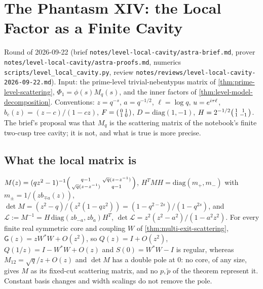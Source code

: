 \section{The Phantasm XIV: the Local Factor as a Finite Cavity}
\label{sec:level-local-cavity}

Round of 2026-09-22 (brief \texttt{notes/level-local-cavity/astra-brief.md}, prover \texttt{notes/level-local-cavity/astra-proofs.md},
numerics \texttt{scripts/level\_local\_cavity.py}, review \texttt{notes/reviews/level-local-cavity-2026-09-22.md}). Input:
the prime-level trivial-nebentypus matrix of \cref{thm:prime-level-scattering}, $\Phi_1 = \phi(s)M_q(s)$, and the inner
factors of \cref{thm:level-model-decomposition}. Conventions: $z = q^{-s}$, $a = q^{-1/2}$, $\ell = \log q$,
$u = e^{i\tau\ell}$, $b_c(z) = (z-c)/(1-cz)$, $F = \begin{psmallmatrix}0&1\\1&0\end{psmallmatrix}$, $D = \mathrm{diag}(1,-1)$,
$H = 2^{-1/2}\begin{psmallmatrix}1&1\\1&-1\end{psmallmatrix}$. The brief's proposal was that $M_q$ is the scattering matrix of the
notebook's finite two-cusp tree cavity; it is not, and what is true is more precise.

\subsection{What the local matrix is}

\begin{proposition}
\label{prop:local-matrix-no-fixed-cut-core}
$M(z) = (qz^2-1)^{-1}\begin{psmallmatrix}q-1&\sqrt q(z-z^{-1})\\\sqrt q(z-z^{-1})&q-1\end{psmallmatrix}$, $H^{T}MH = \mathrm{diag}(m_+,m_-)$ with
$m_\pm = 1/(zb_{\mp a}(z))$, $\det M = (z^2-q)/(z^2(1-qz^2)) = (1-q^{2-2s})/(1-q^{2s})$, and $\mathcal L := M^{-1} = H\,\mathrm{diag}(zb_{-a},zb_a)H^{T}$,
$\det\mathcal L = z^2(z^2-a^2)/(1-a^2z^2)$. For every finite real symmetric core and coupling $W$ of \cref{thm:multi-exit-scattering},
$\mathsf G(z) = zW^{*}W+O(z^2)$, so $Q(z) = I+O(z^2)$, $Q(1/z) = I-W^{*}W+O(z)$ and $S(0) = W^{*}W-I$ is regular, whereas
$M_{12} = \sqrt q/z+O(z)$ and $\det M$ has a double pole at $0$: no core, of any size, gives $M$ as its fixed-cut scattering matrix,
and no $p,\tilde p$ of the theorem represent it. Constant basis changes and width scalings do not remove the pole.
\end{proposition}

